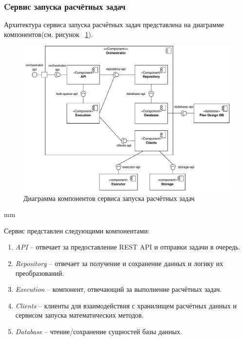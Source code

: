 \subsubsection{\large{Cервис запуска расчётных задач}}

Архитектура сервиса запуска расчётных задач представлена на диаграмме
компонентов(см. рисунок \ \ref{pic:architecture__orchestrator-component}).

\begin{figure}[H]
	\includegraphics[width=\textwidth]{architecture/pictures/orchestrator/component_common}
	\caption{Диаграмма компонентов сервиса запуска расчётных задач}
	\label{pic:architecture__orchestrator-component}
\end{figure}
 mm

Сервис представлен следующими компонентами:
\begin{enumerate}
	\item {
		\textit{API} -- отвечает за предоставление REST API и отправки задачи в очередь.
	}
	\item {
		\textit{Repository} -- отвечает за получение и сохранение данных и логику их преобразований.
	}
	\item {
		\textit{Execution} -- компонент, отвечающий за выполнение расчётных задач.
	}
	\item {
		\textit{Clients} -- клиенты для взаимодействия с хранилищем расчётных данных
		и сервисом запуска математических методов.
	}
	\item {
		\textit{Database} -- чтение/сохранение сущностей базы данных.
	}
\end{enumerate}

